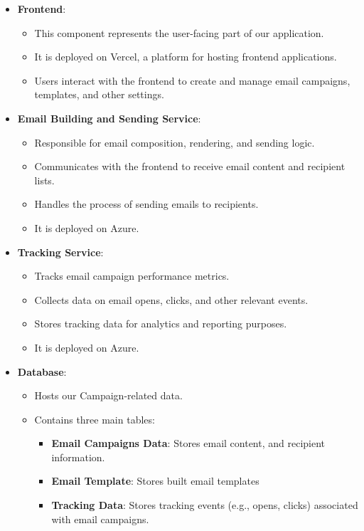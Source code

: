 \begin{itemize}
	\item \textbf{Frontend}:
	      \begin{itemize}
		      \item This component represents the user-facing part of our application.
		      \item It is deployed on Vercel, a platform for hosting frontend applications.
		      \item Users interact with the frontend to create and manage email campaigns, templates, and other settings.
	      \end{itemize}

	\item \textbf{Email Building and Sending Service}:
	      \begin{itemize}
		      \item Responsible for email composition, rendering, and sending logic.
		      \item Communicates with the frontend to receive email content and recipient lists.
		      \item Handles the process of sending emails to recipients.
		      \item It is deployed on Azure.
	      \end{itemize}

	\item \textbf{Tracking Service}:
	      \begin{itemize}
		      \item Tracks email campaign performance metrics.
		      \item Collects data on email opens, clicks, and other relevant events.
		      \item Stores tracking data for analytics and reporting purposes.
              \item It is deployed on Azure.
	      \end{itemize}

	\item \textbf{Database}:
	      \begin{itemize}
		      \item Hosts our Campaign-related data.
		      \item Contains three main tables:
		            \begin{itemize}
			            \item \textbf{Email Campaigns Data}: Stores email content, and recipient information.
			            \item \textbf{Email Template}: Stores built email templates
			            \item \textbf{Tracking Data}: Stores tracking events (e.g., opens, clicks) associated with email campaigns.
		            \end{itemize}
	      \end{itemize}
\end{itemize}
